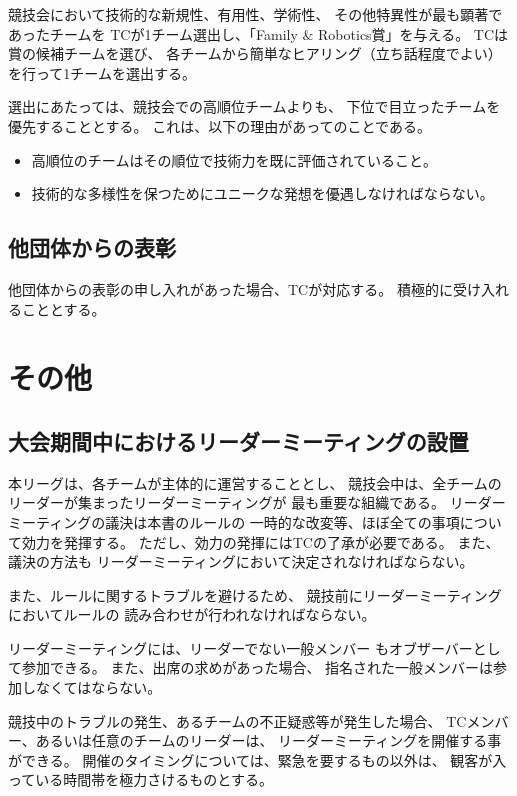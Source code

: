 \documentclass[a4j]{jarticle}
\begin{document}
競技会において技術的な新規性、有用性、学術性、
その他特異性が最も顕著であったチームを
TCが1チーム選出し、「Family \& Robotics賞」を与える。
TCは賞の候補チームを選び、
各チームから簡単なヒアリング（立ち話程度でよい）
を行って1チームを選出する。

選出にあたっては、競技会での高順位チームよりも、
下位で目立ったチームを優先することとする。
これは、以下の理由があってのことである。
\begin{itemize}
	\item 高順位のチームはその順位で技術力を既に評価されていること。
	\item 技術的な多様性を保つためにユニークな発想を優遇しなければならない。
\end{itemize}

\subsection{他団体からの表彰}

他団体からの表彰の申し入れがあった場合、TCが対応する。
積極的に受け入れることとする。

\section{その他}

\subsection{大会期間中におけるリーダーミーティングの設置}

本リーグは、各チームが主体的に運営することとし、
競技会中は、全チームのリーダーが集まったリーダーミーティングが
最も重要な組織である。
リーダーミーティングの議決は本書のルールの
一時的な改変等、ほぼ全ての事項について効力を発揮する。
ただし、効力の発揮にはTCの了承が必要である。
また、議決の方法も
リーダーミーティングにおいて決定されなければならない。

また、ルールに関するトラブルを避けるため、
競技前にリーダーミーティングにおいてルールの
読み合わせが行われなければならない。


リーダーミーティングには、リーダーでない一般メンバー
もオブザーバーとして参加できる。
また、出席の求めがあった場合、
指名された一般メンバーは参加しなくてはならない。


競技中のトラブルの発生、あるチームの不正疑惑等が発生した場合、
TCメンバー、あるいは任意のチームのリーダーは、
リーダーミーティングを開催する事ができる。
開催のタイミングについては、緊急を要するもの以外は、
観客が入っている時間帯を極力さけるものとする。
\end{document}
